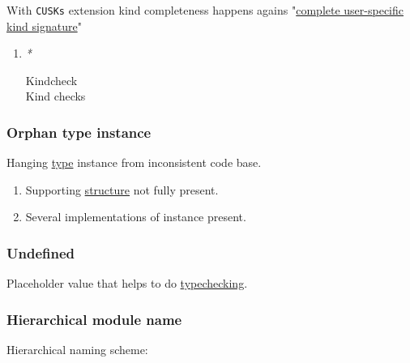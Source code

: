 \documentclass[11pt]{article}
\begin{document}
With \texttt{CUSKs} extension \label{org2f80e91}kind completeness happens agains "\hyperref[org87fa8a5]{complete user-specific kind signature}"\\

\begin{enumerate}
\item \emph{*}
\label{sec:orgf02c2b8}

\label{org834bf13}Kindcheck\\
\label{orgd7d58ab}Kind checks\\
\end{enumerate}

\subsubsection{\label{org57263b1}Orphan type instance}
\label{sec:orgb0ee539}
Hanging \hyperref[orgc4aea2f]{type} instance from inconsistent code base.\\
\begin{enumerate}
\item Supporting \hyperref[org8051f61]{structure} not fully present.\\
\item Several implementations of instance present.\\
\end{enumerate}

\subsubsection{\label{orgabd0f15}Undefined}
\label{sec:org5b45881}
Placeholder value that helps to do \hyperref[org64d9d33]{typechecking}.\\

\subsubsection{\label{org5a7d1d2}Hierarchical module name}
\label{sec:org9940138}
Hierarchical naming scheme:\\
\end{document}
